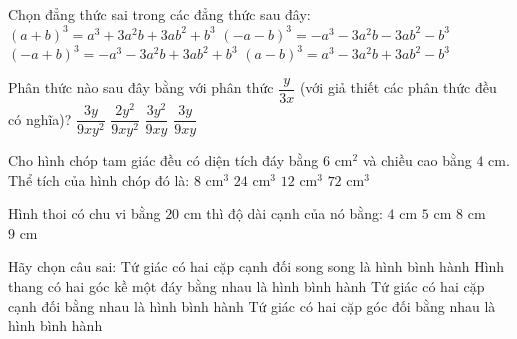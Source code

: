 \documentclass[12pt,a4paper]{article}
\begin{document}
\begin{ex}
Chọn đẳng thức sai trong các đẳng thức sau đây:
\choice
{$(a + b)^3 = a^3 + 3a^2b + 3ab^2 + b^3$}
{$(-a - b)^3 = -a^3 - 3a^2b - 3ab^2 - b^3$}
{\True $(-a + b)^3 = -a^3 - 3a^2b + 3ab^2 + b^3$}
{$(a - b)^3 = a^3 - 3a^2b + 3ab^2 - b^3$}
\end{ex}

\begin{ex}
Phân thức nào sau đây bằng với phân thức $\dfrac{y}{3x}$ (với giả thiết các phân thức đều có nghĩa)?
\choice
{$\dfrac{3y}{9xy^2}$}
{$\dfrac{2y^2}{9xy^2}$}
{\True $\dfrac{3y^2}{9xy}$}
{$\dfrac{3y}{9xy}$}
\end{ex}

\begin{ex}
Cho hình chóp tam giác đều có diện tích đáy bằng $6\text{ cm}^2$ và chiều cao bằng $4\text{ cm}$. Thể tích của hình chóp đó là:
\choice
{\True $8\text{ cm}^3$}
{$24\text{ cm}^3$}
{$12\text{ cm}^3$}
{$72\text{ cm}^3$}
\end{ex}

\begin{ex}
Hình thoi có chu vi bằng $20\text{ cm}$ thì độ dài cạnh của nó bằng:
\choice
{$4\text{ cm}$}
{\True $5\text{ cm}$}
{$8\text{ cm}$}
{$9\text{ cm}$}
\end{ex}

\begin{ex}
Hãy chọn câu sai:
\choice
{Tứ giác có hai cặp cạnh đối song song là hình bình hành}
{\True Hình thang có hai góc kề một đáy bằng nhau là hình bình hành}
{Tứ giác có hai cặp cạnh đối bằng nhau là hình bình hành}
{Tứ giác có hai cặp góc đối bằng nhau là hình bình hành}
\end{ex}
\end{document}
